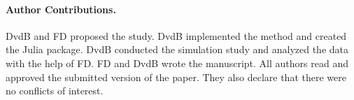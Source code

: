 \documentclass[11pt,a4paper]{article}
\theoremstyle{definition} %
\theoremstyle{case}
\begin{document}
\paragraph{Author Contributions.} DvdB and FD proposed the study. DvdB implemented the method and created the Julia package. DvdB conducted the simulation study and analyzed the data with the help of FD. FD and DvdB wrote the manuscript. All authors read and approved the submitted version of the paper. They also declare that there were no conflicts of interest.

\end{document}

